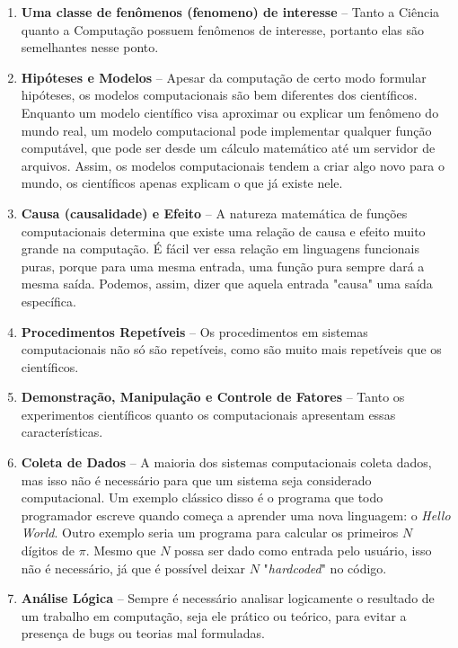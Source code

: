 \begin{enumerate}
    \item \textbf{Uma classe de fenômenos (\gls{fenomeno}) de interesse} -- Tanto a
    Ciência quanto a Computação possuem fenômenos de interesse, portanto elas são
    semelhantes nesse ponto.

    \item \textbf{Hipóteses e Modelos} -- Apesar da computação de certo modo formular
    hipóteses, os modelos computacionais são bem diferentes dos científicos. Enquanto um
    modelo científico visa aproximar ou explicar um fenômeno do mundo real, um modelo
    computacional pode implementar qualquer função computável, que pode ser desde um
    cálculo matemático até um servidor de arquivos. Assim, os modelos computacionais
    tendem a criar algo novo para o mundo, os científicos apenas explicam o que já existe
    nele.

    \item \textbf{Causa (\gls{causalidade}) e Efeito} -- A natureza matemática de funções computacionais
    determina que existe uma relação de causa e efeito muito grande na computação. É fácil
    ver essa relação em linguagens funcionais puras, porque para uma mesma entrada, uma
    função pura sempre dará a mesma saída. Podemos, assim, dizer que aquela entrada
    "causa" uma saída específica. 

    \item \textbf{Procedimentos Repetíveis} -- Os procedimentos em sistemas computacionais
    não só são repetíveis, como são muito mais repetíveis que os científicos.

    \item \textbf{Demonstração, Manipulação e Controle de Fatores} -- Tanto os
    experimentos científicos quanto os computacionais apresentam essas características.

    \item \textbf{Coleta de Dados} -- A maioria dos sistemas computacionais coleta dados,
    mas isso não é necessário para que um sistema seja considerado computacional. Um
    exemplo clássico disso é o programa que todo programador escreve quando começa a
    aprender uma nova linguagem: o \textit{Hello World}. Outro exemplo seria um programa
    para calcular os primeiros $N$ dígitos de $\pi$. Mesmo que $N$ possa ser dado como
    entrada pelo usuário, isso não é necessário, já que é possível deixar $N$
    "\textit{hardcoded}" no código.

    \item \textbf{Análise Lógica} -- Sempre é necessário analisar logicamente o resultado
    de um trabalho em computação, seja ele prático ou teórico, para evitar a presença de
    bugs ou teorias mal formuladas.

\end{enumerate}


